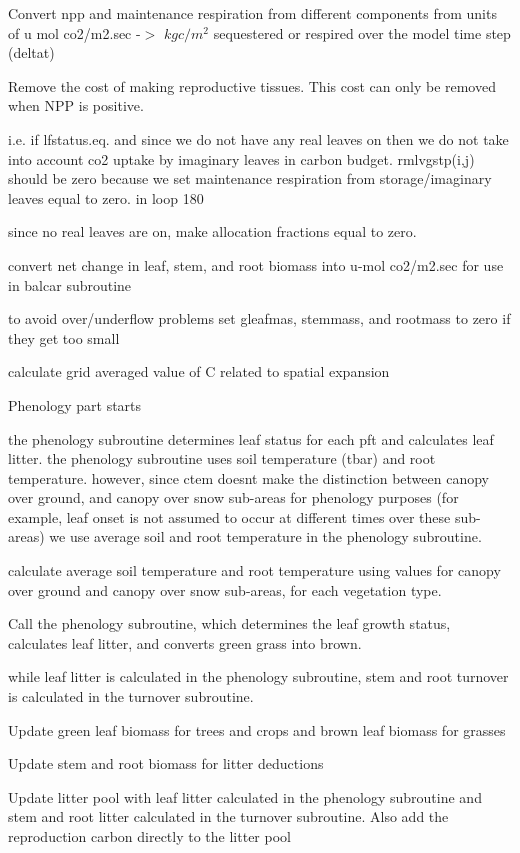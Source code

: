 Convert npp and maintenance respiration from different components from units of u mol co2/m2.\+sec -\/$>$ $kg c/m^2$ sequestered or respired over the model time step (deltat)

Remove the cost of making reproductive tissues. This cost can only be removed when N\+P\+P is positive.

i.\+e. if lfstatus.\+eq. and since we do not have any real leaves on then we do not take into account co2 uptake by imaginary leaves in carbon budget. rmlvgstp(i,j) should be zero because we set maintenance respiration from storage/imaginary leaves equal to zero. in loop 180

since no real leaves are on, make allocation fractions equal to zero.

convert net change in leaf, stem, and root biomass into u-\/mol co2/m2.\+sec for use in balcar subroutine

to avoid over/underflow problems set gleafmas, stemmass, and rootmass to zero if they get too small

calculate grid averaged value of C related to spatial expansion

Phenology part starts

the phenology subroutine determines leaf status for each pft and calculates leaf litter. the phenology subroutine uses soil temperature (tbar) and root temperature. however, since ctem doesn\textquotesingle{}t make the distinction between canopy over ground, and canopy over snow sub-\/areas for phenology purposes (for example, leaf onset is not assumed to occur at different times over these sub-\/areas) we use average soil and root temperature in the phenology subroutine.

calculate average soil temperature and root temperature using values for canopy over ground and canopy over snow sub-\/areas, for each vegetation type.

Call the phenology subroutine, which determines the leaf growth status, calculates leaf litter, and converts green grass into brown.

while leaf litter is calculated in the phenology subroutine, stem and root turnover is calculated in the turnover subroutine.

Update green leaf biomass for trees and crops and brown leaf biomass for grasses

Update stem and root biomass for litter deductions

Update litter pool with leaf litter calculated in the phenology subroutine and stem and root litter calculated in the turnover subroutine. Also add the reproduction carbon directly to the litter pool

